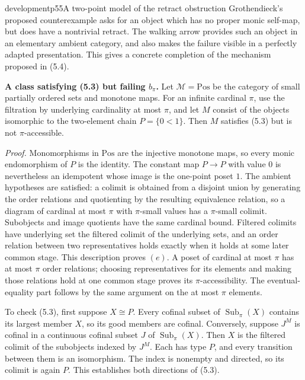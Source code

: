 \begin{dcomment}{development}{p55}{A two-point model of the retract obstruction}
Grothendieck's proposed counterexample asks for an object which has no proper monic self-map, but does have a nontrivial retract. The walking arrow provides such an object in an elementary ambient category, and also makes the failure visible in a perfectly adapted presentation. This gives a concrete completion of the mechanism proposed in (5.4).

\textbf{A class satisfying (5.3) but failing $b_\pi$.}\ours
Let $\mathcal M=\mathrm{Pos}$ be the category of small partially ordered sets and monotone maps. For an infinite cardinal $\pi$, use the filtration by underlying cardinality at most $\pi$, and let $M$ consist of the objects isomorphic to the two-element chain $P=\{0<1\}$. Then $M$ satisfies (5.3) but is not $\pi$-accessible.

\emph{Proof.} Monomorphisms in $\mathrm{Pos}$ are the injective monotone maps, so every monic endomorphism of $P$ is the identity. The constant map $P\to P$ with value $0$ is nevertheless an idempotent whose image is the one-point poset $1$. The ambient hypotheses are satisfied: a colimit is obtained from a disjoint union by generating the order relations and quotienting by the resulting equivalence relation, so a diagram of cardinal at most $\pi$ with $\pi$-small values has a $\pi$-small colimit. Subobjects and image quotients have the same cardinal bound. Filtered colimits have underlying set the filtered colimit of the underlying sets, and an order relation between two representatives holds exactly when it holds at some later common stage. This description proves $(e)$. A poset of cardinal at most $\pi$ has at most $\pi$ order relations; choosing representatives for its elements and making those relations hold at one common stage proves its $\pi$-accessibility. The eventual-equality part follows by the same argument on the at most $\pi$ elements.

To check (5.3), first suppose $X\cong P$. Every cofinal subset of $\operatorname{Sub}_{\pi}(X)$ contains its largest member $X$, so its good members are cofinal. Conversely, suppose $J^M$ is cofinal in a continuous cofinal subset $J$ of $\operatorname{Sub}_{\pi}(X)$. Then $X$ is the filtered colimit of the subobjects indexed by $J^M$. Each has type $P$, and every transition between them is an isomorphism. The index is nonempty and directed, so its colimit is again $P$. This establishes both directions of (5.3).


\end{dcomment}
